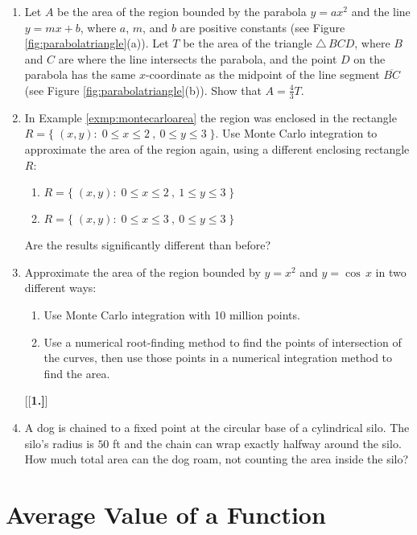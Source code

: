 {\begin{enumerate}[\bfseries 1.]
 \item\label{exer:parabolatriangle} Let $A$ be the area of the region bounded by
  the parabola $y = ax^2$ and the line $y = mx + b$, where $a$, $m$, and $b$ are
  positive constants (see Figure \ref{fig:parabolatriangle}(a)). Let $T$ be the
  area of the triangle $\triangle\,BCD$, where $B$ and $C$ are where the line
  intersects the parabola, and the point $D$ on the parabola has the same
  $x$-coordinate as the midpoint of the line segment $\overline{BC}$ (see Figure
  \ref{fig:parabolatriangle}(b)). Show that $A = \frac{4}{3}T$.
 \item In Example \ref{exmp:montecarloarea} the region was enclosed in the
  rectangle $R = \lbrace\; (x,y):\; 0 \le x \le 2~,~0 \le y \le 3 \;\rbrace$.
  Use Monte Carlo integration to approximate the area of the region again, using
  a different enclosing rectangle $R$:
  \begin{enumerate}[\bfseries (a)]
   \item $R = \lbrace\; (x,y):\; 0 \le x \le 2~,~1 \le y \le 3 \;\rbrace$
   \item $R = \lbrace\; (x,y):\; 0 \le x \le 3~,~0 \le y \le 3 \;\rbrace$
  \end{enumerate}
  Are the results significantly different than before?
 \item Approximate the area of the region bounded by $y = x^2$ and $y = \cos\,x$
  in two different ways:
  \begin{enumerate}[\bfseries (a)]
   \item Use Monte Carlo integration with 10 million points.
   \item Use a numerical root-finding method to find the points of intersection
    of the curves, then use those points in a numerical integration method to
    find the area.
  \end{enumerate}
[{[\bfseries 1.]}]
 \item A dog is chained to a fixed point at the circular base of a cylindrical
  silo. The silo's radius is $50$ ft and the chain can wrap exactly halfway
  around the silo. How much total area can the dog roam, not counting the area
  inside the silo?
\end{enumerate}
}
\newpage
\section{Average Value of a Function}
\piccaption[]{\label{fig:orbit}}

